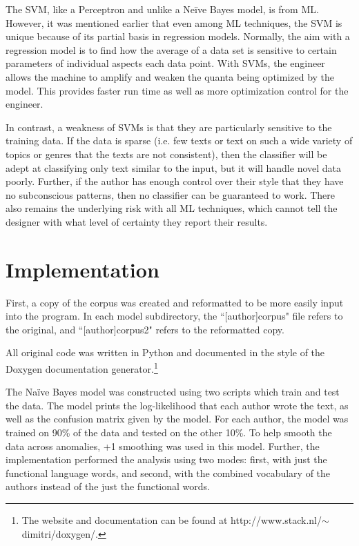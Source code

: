 \documentclass[11pt,letterpaper]{article}
\begin{document}
The SVM, like a Perceptron and unlike a Ne{\"i}ve Bayes model, is from ML. However, it was mentioned earlier that even among ML techniques, the SVM is unique because of its partial basis in regression models. Normally, the aim with a regression model is to find how the average of a data set is sensitive to certain parameters of individual aspects each data point. With SVMs, the engineer allows the machine to amplify and weaken the quanta being optimized by the model. This provides faster run time as well as more optimization control for the engineer.

In contrast, a weakness of SVMs is that they are particularly sensitive to the training data.  If the data is sparse  (i.e. few texts or text on such a wide variety of topics or genres that the texts are not consistent), then the classifier will be adept at classifying only text similar to the input, but it will handle novel data poorly. Further, if the author has enough control over their style that they have no subconscious patterns, then no classifier can be guaranteed to work. There also remains the underlying risk with all ML techniques, which cannot tell the designer with what level of certainty they report their results.

\section{Implementation}

First, a copy of the corpus was created and reformatted to be more easily input into the program. In each model subdirectory, the ``[author]corpus" file refers to the original, and ``[author]corpus2" refers to the reformatted copy.

All original code was written in Python and documented in the style of the Doxygen documentation generator.\footnote{The website and documentation can be found at http://www.stack.nl/$\sim$dimitri/doxygen/.}

The Na{\"i}ve Bayes model was constructed using two scripts which train and test the data. The model prints the log-likelihood that each author wrote the text, as well as the confusion matrix given by the model. For each author, the model was trained on 90\% of the data and tested on the other 10\%. To help smooth the data across anomalies, +1 smoothing was used in this model. Further, the implementation performed the analysis using two modes: first, with just the functional language words, and second, with the combined vocabulary of the authors instead of the just the functional words.
\end{document}
